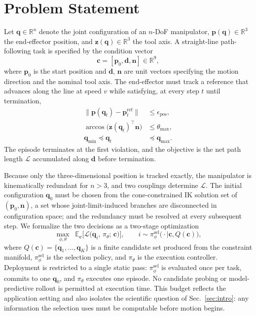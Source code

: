 \documentclass[journal]{IEEEtran}
\begin{document}
\section{Problem Statement}
\label{sec:problem}
Let $\mathbf{q}\in\mathbb{R}^{n}$ denote the joint configuration of an
$n$-DoF manipulator, $\mathbf{p}(\mathbf{q})\in\mathbb{R}^{3}$ the
end-effector position, and $\mathbf{z}(\mathbf{q})\in\mathbb{R}^{3}$ the
tool axis. A straight-line path-following task is specified by the
condition vector
\begin{equation}
\mathbf{c}=[\mathbf{p}_{0},\mathbf{d},\mathbf{n}]\in\mathbb{R}^{9},
\end{equation}
where $\mathbf{p}_{0}$ is the start position and $\mathbf{d}$,
$\mathbf{n}$ are unit vectors specifying the motion direction and the
nominal tool axis. The end-effector must track a reference that advances
along the line at speed $v$ while satisfying, at every step $t$ until
termination,
\begin{align}
\|\mathbf{p}(\mathbf{q}_{t})-\mathbf{p}_{t}^{\mathrm{ref}}\|
  &\leq \epsilon_{\mathrm{pos}},\label{eq:c-pos}\\
\arccos\!\big(\mathbf{z}(\mathbf{q}_{t})^{\!\top}\mathbf{n}\big)
  &\leq \theta_{\max},\label{eq:c-cone}\\
\mathbf{q}_{\min}\preceq \mathbf{q}_{t} &\preceq
  \mathbf{q}_{\max}.\label{eq:c-jl}
\end{align}
The episode terminates at the first violation, and the objective is the
net path length $\mathcal{L}$ accumulated along $\mathbf{d}$ before
termination.

Because only the three-dimensional position is tracked exactly, the
manipulator is kinematically redundant for $n>3$, and two couplings
determine $\mathcal{L}$. The initial configuration $\mathbf{q}_{0}$ must
be chosen from the cone-constrained IK solution set of
$(\mathbf{p}_{0},\mathbf{n})$, a set whose joint-limit-induced branches
are disconnected in configuration space; and the redundancy must be
resolved at every subsequent step. We formalize the two decisions as a
two-stage optimization
\begin{equation}
\max_{\phi,\theta}\;\;
\mathbb{E}_{\mathbf{c}}\Big[
\mathcal{L}\big(\mathbf{q}_{i},\,\pi_{\theta};\,\mathbf{c}\big)\Big],
\qquad
i\sim\pi^{\mathrm{sel}}_{\phi}\big(\cdot\mid\mathbf{c},
Q(\mathbf{c})\big),
\label{eq:objective}
\end{equation}
where $Q(\mathbf{c})=\{\mathbf{q}_{1},\dots,\mathbf{q}_{K}\}$ is a finite
candidate set produced from the constraint manifold,
$\pi^{\mathrm{sel}}_{\phi}$ is the selection policy, and $\pi_{\theta}$
is the execution controller. Deployment is restricted to a single static
pass: $\pi^{\mathrm{sel}}_{\phi}$ is evaluated once per task, commits to
one $\mathbf{q}_{0}$, and $\pi_{\theta}$ executes one episode. No
candidate probing or model-predictive rollout is permitted at execution
time. This budget reflects the application setting and also isolates the
scientific question of Sec.~\ref{sec:intro}: any information the
selection uses must be computable before motion begins.
\end{document}

